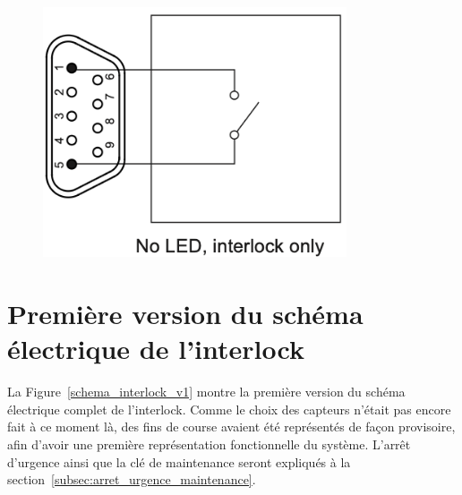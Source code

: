 \begin{minipage}[c]{0.35\textwidth}
    \begin{figure}[H]
        \begin{center}
            \includegraphics[width=0.8\textwidth]{assets/figures/Protections_laser/Securite_electrique/interlock_only.png}
        \end{center}
        \label{Interlock_only}
    \end{figure}
\end{minipage}

\newpage
\section{Première version du schéma électrique de l'interlock}
La Figure~\ref{schema_interlock_v1} montre la première version du schéma électrique complet de l'interlock. Comme le choix des capteurs n'était pas encore fait à ce moment là, des fins de course avaient été représentés de façon provisoire, afin d'avoir une première représentation fonctionnelle du système. L'arrêt d'urgence ainsi que la clé de maintenance seront expliqués à la section~\ref{subsec:arret_urgence_maintenance}.

